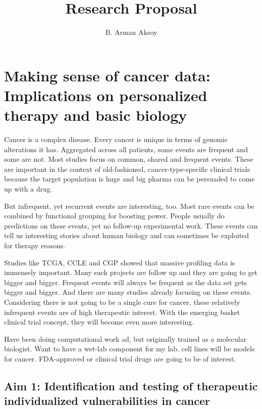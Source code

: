 \documentclass[12pt,letterpaper]{article}
\title{Research Proposal}
\author{B. Arman Aksoy}
\date{}
\begin{document}
\maketitle

\section*{Making sense of cancer data: Implications on personalized therapy and basic biology}
Cancer is a complex disease.
Every cancer is unique in terms of genomic alterations it has.
Aggregated across all patients, some events are frequent and some are not.
Most studies focus on common, shared and frequent events.
These are important in the context of old-fashioned, cancer-type-specific clinical trials
because the target population is huge and big pharma can be persuaded to come up with a drug.

But infrequent, yet recurrent events are interesting, too.
Most rare events can be combined by functional grouping for boosting power.
People usually do predictions on these events,
yet no follow-up experimental work.
These events can tell us interesting stories about human biology
and can sometimes be exploited for therapy reasons.

Studies like TCGA, CCLE and CGP showed that massive profiling data is immensely important.
Many such projects are follow up and they are going to get bigger and bigger.
Frequent events will always be frequent as the data set gets bigger and bigger.
And there are many studies already focusing on these events.
Considering there is not going to be a single cure for cancer,
these relatively infrequent events are of high therapeutic interest.
With the emerging basket clinical trial concept,
they will become even more interesting.

Have been doing computational work ad, but originally trained as a molecular biologist.
Want to have a wet-lab component for my lab.
cell lines will be models for cancer.
FDA-approved or clinical trial drugs are going to be of interest.

\subsection*{Aim 1: Identification and testing of therapeutic individualized vulnerabilities in cancer}
\end{document}
